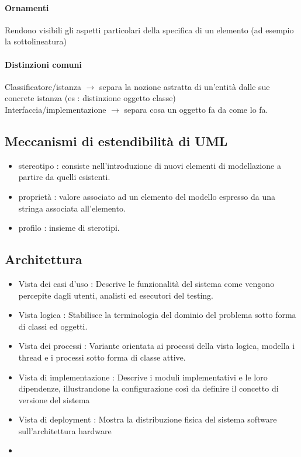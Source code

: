 \documentclass[a4paper,12pt]{report}
\begin{document}
	\paragraph{Ornamenti} Rendono visibili gli aspetti particolari della specifica di un elemento (ad esempio la sottolineatura)
	\paragraph{Distinzioni comuni} Classificatore/istanza $\rightarrow$ separa la nozione astratta di un'entità dalle sue concrete istanza (es : distinzione oggetto classe) \\
	Interfaccia/implementazione $\rightarrow$ separa cosa un oggetto fa da come lo fa.
	\newpage
	\subsection{Meccanismi di estendibilità di UML}
	\begin{itemize}
		\item stereotipo : consiste nell'introduzione di nuovi elementi di modellazione a partire da quelli esistenti.
		\item proprietà : valore associato ad un elemento del modello espresso da una stringa associata all'elemento.
		\item profilo : insieme di sterotipi.
	\end{itemize}
	
	\subsection{Architettura}
	\begin{itemize}
		\item Vista dei casi d'uso : Descrive le funzionalità del sistema come vengono percepite dagli utenti, analisti ed esecutori del testing.
		\item Vista logica : Stabilisce la terminologia del dominio del problema sotto forma di classi ed oggetti.
		\item Vista dei processi : Variante orientata ai processi della vista logica, modella i thread e i processi sotto forma di classe attive.
		\item Vista di implementazione : Descrive i moduli implementativi e le loro dipendenze, illustrandone la configurazione così da definire il concetto di versione del sistema
		\item Vista di deployment : Mostra la distribuzione fisica del sistema software sull'architettura hardware
		\item
	\end{itemize}
\end{document}
